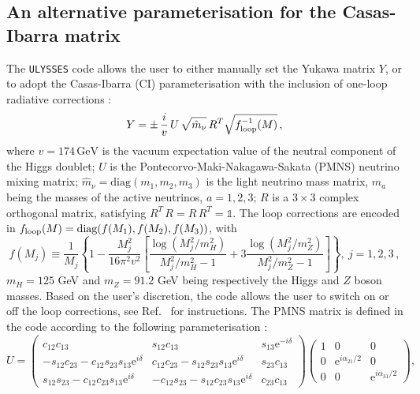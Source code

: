 \documentclass[12pt, a4paper]{article}
\begin{document}
\subsection{An alternative parameterisation for the Casas-Ibarra matrix}
The \texttt{ULYSSES} code allows the user to either manually set the Yukawa matrix $Y$, or to adopt the Casas-Ibarra (CI) parameterisation with the inclusion of one-loop radiative corrections \cite{Casas:2001sr, Lopez-Pavon:2015cga}:
\begin{equation}
Y =
 \pm \, \dfrac{i}{v}\,U\, \sqrt{\hat{m}_\nu}\,R^T\sqrt{f^{-1}_{\rm loop}(M)}\,,
\label{eq:Casas-Ibarra}
\end{equation}
%
where $v = 174\,\text{GeV}$ is the vacuum expectation value of the neutral component of the Higgs doublet; $U$ is the Pontecorvo-Maki-Nakagawa-Sakata (PMNS) neutrino mixing matrix; $\hat{m}_\nu = \text{diag}(m_1, m_2,m_3)$ is the light neutrino mass matrix, $m_a$ being the masses of the active neutrinos, $a=1,2,3$; $R$ is a $3\times 3$ complex orthogonal matrix, satisfying $R^T\,R = R\,R^T = \mathbb{1}$. The loop corrections are encoded in $f_{\rm loop}(M) = \text{diag}(f(M_1), f(M_2), f(M_3))$, with \cite{Pilaftsis_1992, Grimus_2002, Aristizabal_Sierra_2011, Lopez_Pavon_2013}
\begin{equation}
f(M_j) \equiv \frac{1}{M_j}\left\{1 - \frac{M_j^2}{16\pi^2v^2}\left[\frac{\log{(M_j^2/m_H^2)}}{M_j^2/m_H^2 - 1}+3\frac{\log{(M_j^2/m_Z^2)}}{M_j^2/m_Z^2 - 1}\right]\right\},
~j=1,2,3\,,
\label{eq:Mloop}
\end{equation}
$m_H = 125$ GeV and 
$m_Z = 91.2$ GeV being respectively the Higgs and $Z$ boson 
masses. Based on the user's discretion, the code allows the user to switch on or off the loop corrections,
see Ref.~\cite{Granelli:2020pim} for instructions. 
The PMNS matrix is defined in the code according to the following parameterisation \cite{Tanabashi:2018oca}:
\begin{equation}
\label{PMNS}
U = \begin{pmatrix}
c_{12}c_{13}&s_{12}c_{13}&s_{13}\text{e}^{-i\delta}\\
-s_{12}c_{23}-c_{12}s_{23}s_{13}\text{e}^{i\delta}&c_{12}c_{23}-s_{12}s_{23}s_{13}\text{e}^{i\delta}&s_{23}c_{13}\\
s_{12}s_{23}-c_{12}c_{23}s_{13}\text{e}^{i\delta}&-c_{12}s_{23}-s_{12}c_{23}s_{13}\text{e}^{i\delta}&c_{23}c_{13}
\end{pmatrix}
\begin{pmatrix}
1&0&0\\
0&\text{e}^{i\alpha_{21}/2}&0\\
0&0& \text{e}^{i\alpha_{31}/2}
\end{pmatrix},
\end{equation}
\end{document}
